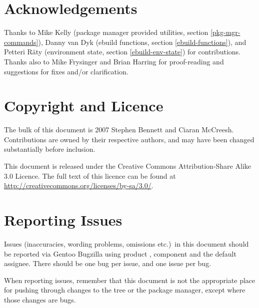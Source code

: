 \section*{Acknowledgements}

Thanks to Mike Kelly (package manager provided utilities, section \ref{pkg-mgr-commands}),
Danny van Dyk (ebuild functions, section \ref{ebuild-functions}), and
Petteri R\"aty (environment state, section \ref{ebuild-env-state}) for contributions. Thanks also to
Mike Frysinger and Brian Harring for proof-reading and suggestions for fixes and/or clarification.

\section*{Copyright and Licence}

The bulk of this document is \textcopyright{} 2007 Stephen Bennett and Ciaran McCreesh. Contributions
are owned by their respective authors, and may have been changed substantially before inclusion.

This document is released under the Creative Commons Attribution-Share Alike 3.0 Licence. The full
text of this licence can be found at \url{http://creativecommons.org/licenses/by-sa/3.0/}.

\section*{Reporting Issues}

Issues (inaccuracies, wording problems, omissions etc.)\ in this document should be reported via
Gentoo Bugzilla using product , component  and the default
assignee. There should be one bug per issue, and one issue per bug.

When reporting issues, remember that this document is not the appropriate place for pushing
through changes to the tree or the package manager, except where those changes are bugs.



